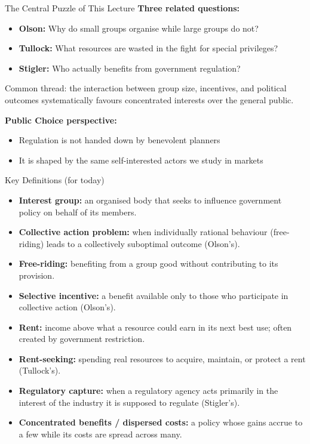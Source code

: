 \documentclass[10pt]{beamer}
\begin{document}
\begin{frame}{The Central Puzzle of This Lecture}
\textbf{Three related questions:}

\begin{itemize}
\item \textbf{Olson:} Why do small groups organise while large groups do not?
\item \textbf{Tullock:} What resources are wasted in the fight for special privileges?
\item \textbf{Stigler:} Who actually benefits from government regulation?
\end{itemize}

\vspace{0.2cm}
\alert{Common thread:} the interaction between group size, incentives, and political outcomes systematically favours concentrated interests over the general public.

\vspace{0.2cm}
\textbf{Public Choice perspective:}
\begin{itemize}
\item Regulation is not handed down by benevolent planners
\item It is shaped by the same self-interested actors we study in markets
\end{itemize}
\end{frame}


\begin{frame}{Key Definitions (for today)}
\small
\begin{itemize}
\item \textbf{Interest group:} an organised body that seeks to influence government policy on behalf of its members.
\item \textbf{Collective action problem:} when individually rational behaviour (free-riding) leads to a collectively suboptimal outcome (Olson's).
\item \textbf{Free-riding:} benefiting from a group good without contributing to its provision.
\item \textbf{Selective incentive:} a benefit available only to those who participate in collective action (Olson's).
\item \textbf{Rent:} income above what a resource could earn in its next best use; often created by government restriction.
\item \textbf{Rent-seeking:} spending real resources to acquire, maintain, or protect a rent (Tullock's).
\item \textbf{Regulatory capture:} when a regulatory agency acts primarily in the interest of the industry it is supposed to regulate (Stigler's).
\item \textbf{Concentrated benefits / dispersed costs:} a policy whose gains accrue to a few while its costs are spread across many.
\end{itemize}
\end{frame}
\end{document}
